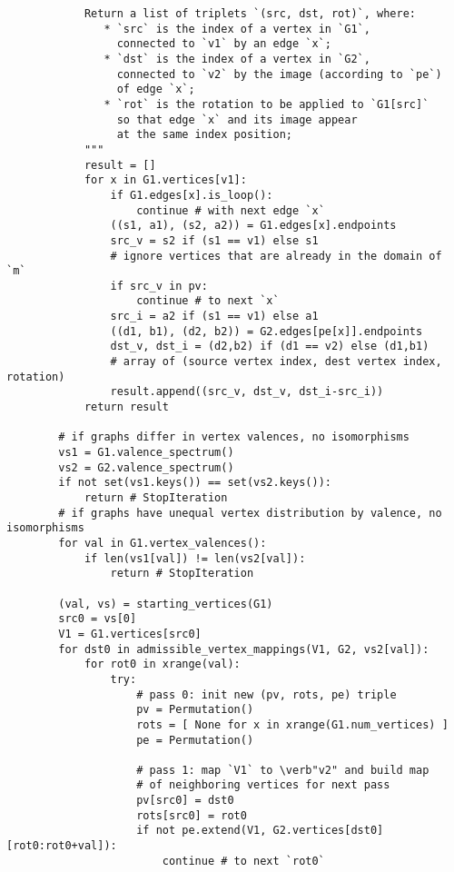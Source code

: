 \begin{lstlisting}
            Return a list of triplets `(src, dst, rot)`, where:
               * `src` is the index of a vertex in `G1`,
                 connected to `v1` by an edge `x`;
               * `dst` is the index of a vertex in `G2`,
                 connected to `v2` by the image (according to `pe`)
                 of edge `x`;
               * `rot` is the rotation to be applied to `G1[src]`
                 so that edge `x` and its image appear
                 at the same index position;
            """
            result = []
            for x in G1.vertices[v1]:
                if G1.edges[x].is_loop():
                    continue # with next edge `x`
                ((s1, a1), (s2, a2)) = G1.edges[x].endpoints
                src_v = s2 if (s1 == v1) else s1
                # ignore vertices that are already in the domain of `m`
                if src_v in pv:
                    continue # to next `x`
                src_i = a2 if (s1 == v1) else a1
                ((d1, b1), (d2, b2)) = G2.edges[pe[x]].endpoints
                dst_v, dst_i = (d2,b2) if (d1 == v2) else (d1,b1)
                # array of (source vertex index, dest vertex index, rotation)
                result.append((src_v, dst_v, dst_i-src_i))
            return result
            
        # if graphs differ in vertex valences, no isomorphisms
        vs1 = G1.valence_spectrum()
        vs2 = G2.valence_spectrum()
        if not set(vs1.keys()) == set(vs2.keys()):
            return # StopIteration
        # if graphs have unequal vertex distribution by valence, no isomorphisms
        for val in G1.vertex_valences():
            if len(vs1[val]) != len(vs2[val]):
                return # StopIteration

        (val, vs) = starting_vertices(G1)
        src0 = vs[0]
        V1 = G1.vertices[src0]
        for dst0 in admissible_vertex_mappings(V1, G2, vs2[val]):
            for rot0 in xrange(val):
                try:
                    # pass 0: init new (pv, rots, pe) triple
                    pv = Permutation()
                    rots = [ None for x in xrange(G1.num_vertices) ]
                    pe = Permutation()

                    # pass 1: map `V1` to \verb"v2" and build map
                    # of neighboring vertices for next pass
                    pv[src0] = dst0
                    rots[src0] = rot0
                    if not pe.extend(V1, G2.vertices[dst0][rot0:rot0+val]):
                        continue # to next `rot0`


\end{lstlisting}
